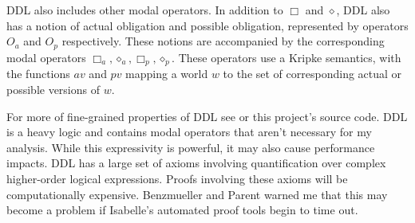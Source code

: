 \begin{isabellebody}
\begin{isamarkuptext}
DDL also includes other modal operators. In addition to $\Box$ and $\diamond$, DDL also has a notion
of actual obligation and possible obligation, represented by operators $O_a$ and $O_p$ respectively. 
These notions are accompanied by the corresponding modal operators $\Box_a, \diamond_a, \Box_p, \diamond_p$. 
These operators use a Kripke semantics, with the functions $av$ and $pv$ mapping a world $w$ to the set 
of corresponding actual or possible versions of $w$. 

For more of fine-grained properties of DDL see \citep{CJDDL} or this project's source code. DDL is a heavy logic and contains modal operators 
that aren't necessary for my analysis. While this expressivity is powerful, it may also cause performance
impacts. DDL has a large set of axioms involving quantification over complex higher-order
logical expressions. Proofs involving these axioms will be computationally expensive.  Benzmueller 
and Parent warned me that this may become a problem if Isabelle's automated proof tools begin to time out.%
\end{isamarkuptext}\isamarkuptrue%
%
\isadelimtheory
%
\endisadelimtheory
%
\isatagtheory
%
\endisatagtheory
{\isafoldtheory}%
%
\isadelimtheory
%
\endisadelimtheory
%
\end{isabellebody}%
\endinput
